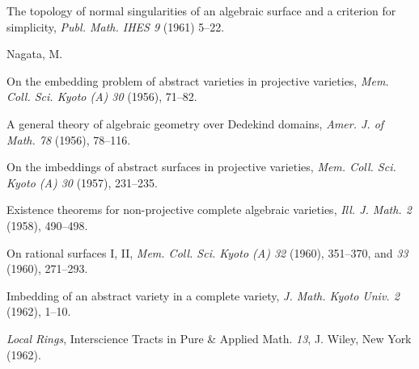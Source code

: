 {\noindent\hangindent=25bp\hspace*{6bp}%
The topology of normal singularities of an algebraic surface and a criterion for simplicity, \emph{Publ. Math. IHES 9} (1961) 5--22.\par
\par\vspace{2.15pt}\noindent \hypertarget{bib-480-8}{}Nagata, M.\par
\noindent\hangindent=25bp\hspace*{6bp}%
On the embedding problem of abstract varieties in projective varieties, \emph{Mem. Coll. Sci. Kyoto (A) 30} (1956), 71--82.\par
\noindent\hangindent=25bp\hspace*{6bp}%
A general theory of algebraic geometry over Dedekind domains, \emph{Amer. J. of Math. 78} (1956), 78--116.\par
\noindent\hangindent=25bp\hspace*{6bp}%
On the imbeddings of abstract surfaces in projective varieties, \emph{Mem. Coll. Sci. Kyoto (A) 30} (1957), 231--235.\par
\noindent\hangindent=25bp\hspace*{6bp}%
Existence theorems for non-projective complete algebraic varieties, \emph{Ill. J. Math. 2} (1958), 490--498.\par
\noindent\hangindent=25bp\hspace*{6bp}%
On rational surfaces I, II, \emph{Mem. Coll. Sci. Kyoto (A) 32} (1960), 351--370, and \emph{33} (1960), 271--293.\par
\noindent\hangindent=25bp\hspace*{6bp}%
Imbedding of an abstract variety in a complete variety, \emph{J. Math. Kyoto Univ. 2} (1962), 1--10.\par
\noindent\hangindent=25bp\hspace*{6bp}%
\emph{Local Rings}, Interscience Tracts in Pure \& Applied Math. \emph{13}, J. Wiley, New York (1962).\par
}
